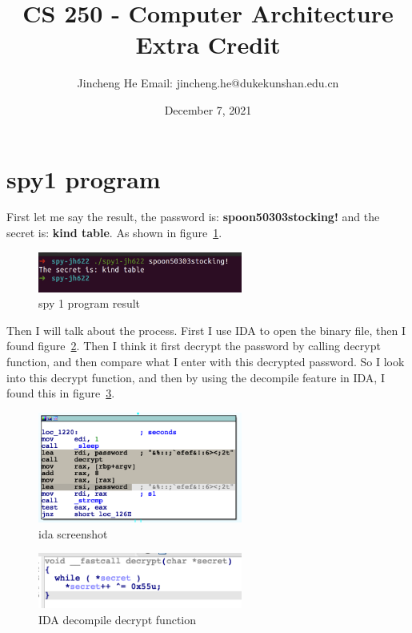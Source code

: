 \documentclass{article}
\title{CS 250 - Computer Architecture \\ Extra Credit}
\author{Jincheng He Email: jincheng.he@dukekunshan.edu.cn}
\date{December 7, 2021}
\theoremstyle{remark}
\theoremstyle{definition}
\begin{document}
    \maketitle


    \section{spy1 program}
    First let me say the result, the password is: \textbf{spoon50303stocking!} and the secret is: \textbf{kind table}. As shown in figure~\ref{fig:spy1_result}.

    \begin{figure}[!htbp]
        \centering
        \includegraphics[width=0.6\textwidth]{img/spy1_result.png}
        \caption{spy 1 program result}
        \label{fig:spy1_result}
    \end{figure}

    Then I will talk about the process. First I use IDA to open the binary file, then I found figure~\ref{fig:spy1_decrypt}. Then I think it first decrypt the password by calling decrypt function, and then compare what I enter with this decrypted password. So I look into this decrypt function, and then by using the decompile feature in IDA, I found this in figure~\ref{fig:spy1_decrypt_func}.

    \begin{figure}[!htbp]
        \centering
        \includegraphics[width=0.6\textwidth]{img/ida_spy1_decrypt.png}
        \caption{ida screenshot}
        \label{fig:spy1_decrypt}
    \end{figure}

    \begin{figure}[!htbp]
        \centering
        \includegraphics[width=0.6\textwidth]{img/spy1_decrypt_func.png}
        \caption{IDA decompile decrypt function}
        \label{fig:spy1_decrypt_func}
    \end{figure}
\end{document}
